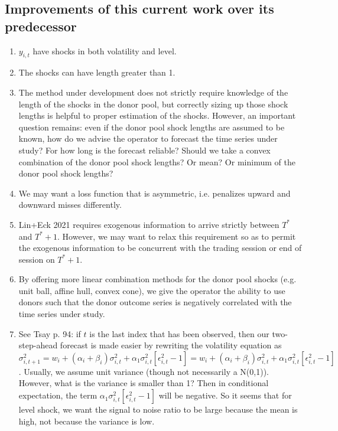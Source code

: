 \documentclass[11pt]{article}
\theoremstyle{definition}
\begin{document}
\subsection{Improvements of this current work over its predecessor}
\begin{enumerate}
\item $y_{i,t}$ have shocks in both volatility and level.
\item The shocks can have length greater than 1.
\item The method under development does not strictly require knowledge of the length of the shocks in the donor pool, but correctly sizing up those shock lengths is helpful to proper estimation of the shocks.  However, an important question remains: even if the donor pool shock lengths are assumed to be known, how do we advise the operator to forecast the time series under study?  For how long is the forecast reliable?  Should we take a convex combination of the donor pool shock lengths?  Or mean? Or minimum of the donor pool shock lengths?
\item We may want a loss function that is asymmetric, i.e. penalizes upward and downward misses differently.
\item Lin+Eck 2021 requires exogenous information to arrive strictly between $T^{*}$ and $T^{*}+1$.  However, we may want to relax this requirement so as to permit the exogenous information to be concurrent with the trading session or end of session on $T^{*}+1$.
\item By offering more linear combination methods for the donor pool shocks (e.g. unit ball, affine hull, convex cone), we give the operator the ability to use donors such that the donor outcome series is negatively correlated with the time series under study.
\item See Tsay p. 94: if $t$ is the last index that has been observed, then our two-step-ahead forecast is made easier by rewriting the volatility equation as $\sigma^{2}_{i,t+1} = w_{i} + (\alpha_{i} + \beta_{i})\sigma^{2}_{i,t} + \alpha_{1}\sigma^{2}_{i,t}[\epsilon^{2}_{i,t} - 1]= w_{i} + (\alpha_{i} + \beta_{i})\sigma^{2}_{i,t} + \alpha_{1}\sigma^{2}_{i,t}[\epsilon^{2}_{i,t} - 1] $.  Usually, we assume unit variance (though not necessarily a N(0,1)).  However, what is the variance is smaller than 1?  Then in conditional expectation, the term $\alpha_{1}\sigma^{2}_{i,t}[\epsilon^{2}_{i,t} - 1]$ will be negative.  So it seems that for level shock, we want the signal to noise ratio to be large because the mean is high, not because the variance is low.
\end{enumerate}
\end{document}
